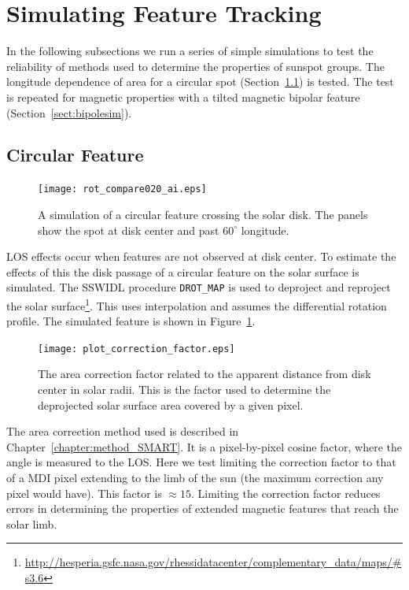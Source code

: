 \section{Simulating Feature Tracking}\label{sect:simuncert}

In the following subsections we run a series of simple simulations to test the reliability of methods used to determine the properties of sunspot groups. The longitude dependence of area for a circular spot (Section~\ref{sect:spotsim}) is tested. The test is repeated for magnetic properties with a tilted magnetic bipolar feature (Section~\ref{sect:bipolesim}).


\subsection{Circular Feature}\label{sect:spotsim}

\begin{figure}[!ht]
\begin{center}
\texttt{[image: rot\_compare020\_ai.eps]}
\end{center}
\caption{A simulation of a circular feature crossing the solar disk. The panels show the spot at disk center and past $60^{\circ}$ longitude.}\label{fig:spotsim}
\end{figure}

\gls{LOS} effects occur when features are not observed at disk center. To estimate the effects of this the disk passage of a circular feature on the solar surface is simulated. The \gls{SSWIDL} procedure \verb!DROT_MAP! is used to deproject and reproject the solar surface\footnote{\url{http://hesperia.gsfc.nasa.gov/rhessidatacenter/complementary_data/maps/\#s3.6}}. This uses interpolation and assumes the \cite{Howard:1990} differential rotation profile. The simulated feature is shown in Figure~\ref{fig:spotsim}.

\begin{figure}[!ht]
\begin{center}
\texttt{[image: plot\_correction\_factor.eps]}
\end{center}
\caption{The area correction factor related to the apparent distance from disk center in solar radii. This is the factor used to determine the deprojected solar surface area covered by a given pixel.}\label{fig:areacor}
\end{figure}

The area correction method used is described in Chapter~\ref{chapter:method_SMART}. It is a pixel-by-pixel cosine factor, where the angle is measured to the \gls{LOS}.
Here we test limiting the correction factor to that of a \gls{MDI} pixel extending to the limb of the sun (the maximum correction any pixel would have). This factor is $\approx15$. Limiting the correction factor reduces errors in determining the properties of extended magnetic features that reach the solar limb. 

